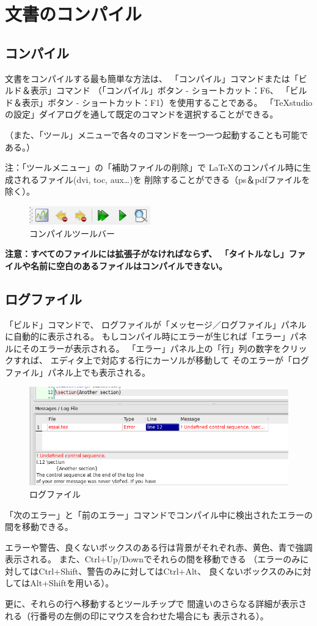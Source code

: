 \chapter{文書のコンパイル}

\section{コンパイル}

文書をコンパイルする最も簡単な方法は、
「コンパイル」コマンドまたは「ビルド＆表示」コマンド
（「コンパイル」ボタン - ショートカット：F6、
「ビルド＆表示」ボタン - ショートカット：F1）を使用することである。
「TeXstudioの設定」ダイアログを通して既定のコマンドを選択することができる。

（また、「ツール」メニューで各々のコマンドを一つ一つ起動することも可能である。）

注：「ツールメニュー」の「補助ファイルの削除」で
LaTeXのコンパイル時に生成されるファイル(dvi, toc, aux\ldots{})を
削除することができる（ps＆pdfファイルを除く）。


\begin{figure}[H]
  \centering
  \includegraphics{compile_toolbar.png}
  \caption{コンパイルツールバー}
\end{figure}

\textbf{注意：すべてのファイルには拡張子がなければならず、
「タイトルなし」ファイルや名前に空白のあるファイルはコンパイルできない。}

\section{ログファイル}

「ビルド」コマンドで、
ログファイルが「メッセージ／ログファイル」パネルに自動的に表示される。
もしコンパイル時にエラーが生じれば「エラー」パネルにそのエラーが表示される。
「エラー」パネル上の「行」列の数字をクリックすれば、
エディタ上で対応する行にカーソルが移動して
そのエラーが「ログファイル」パネル上でも表示される。

\begin{figure}[H]
  \centering
  \includegraphics[width=.8\linewidth]{doc15.png}
  \caption{ログファイル}
\end{figure}

「次のエラー」と「前のエラー」コマンドでコンパイル中に検出されたエラーの間を移動できる。

エラーや警告、良くないボックスのある行は背景がそれぞれ赤、黄色、青で強調表示される。
また、Ctrl+Up/Downでそれらの間を移動できる
（エラーのみに対してはCtrl+Shift、警告のみに対してはCtrl+Alt、
良くないボックスのみに対してはAlt+Shiftを用いる）。

更に、それらの行へ移動するとツールチップで
間違いのさらなる詳細が表示される（行番号の左側の印にマウスを合わせた場合にも
表示される）。
